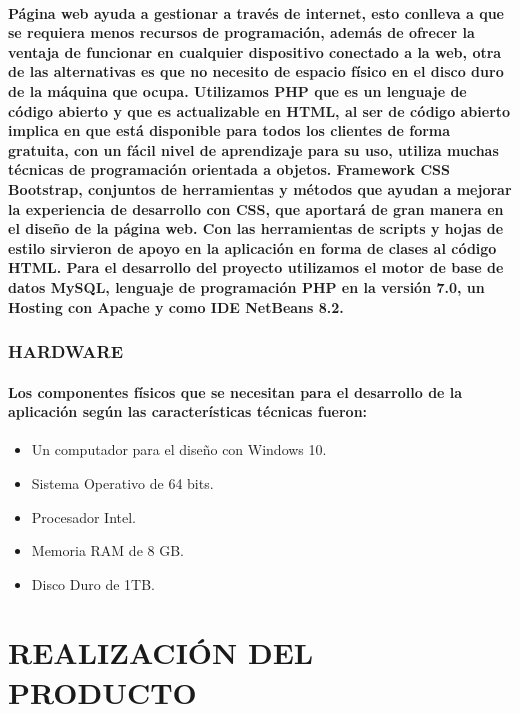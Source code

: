\documentclass[12pt,a4paper]{article}
\begin{document}
\paragraph{Página web ayuda a gestionar a través de internet, esto conlleva a que se requiera menos recursos de programación, además de ofrecer la ventaja de funcionar en cualquier dispositivo conectado a la web, otra de las alternativas es que no necesito de espacio físico en el disco duro de la máquina que ocupa. Utilizamos PHP que es un lenguaje de código abierto y que es actualizable en HTML, al ser de código abierto implica en que está disponible para todos los clientes de forma gratuita, con un fácil nivel de aprendizaje para su uso, utiliza muchas técnicas de programación orientada a objetos. Framework CSS Bootstrap, conjuntos de herramientas y métodos que ayudan a mejorar la experiencia de desarrollo con CSS, que aportará de gran manera en el diseño de la página web. Con las herramientas de scripts y hojas de estilo sirvieron de apoyo en la aplicación en forma de clases al código HTML. Para el desarrollo del proyecto utilizamos el motor de base de datos MySQL, lenguaje de programación PHP en la versión 7.0, un Hosting con Apache y como IDE NetBeans 8.2.}
\subsubsection{HARDWARE}
\paragraph{Los componentes físicos que se necesitan para el desarrollo de la aplicación según las características técnicas fueron: }
\begin{itemize}

\item Un computador para el diseño con Windows 10.
\item Sistema Operativo de 64 bits.
\item Procesador Intel. 
\item Memoria RAM de 8 GB.
\item Disco Duro de 1TB. 

\end{itemize}

\section{REALIZACIÓN DEL PRODUCTO }
\subsubsection{}
\end{document}
